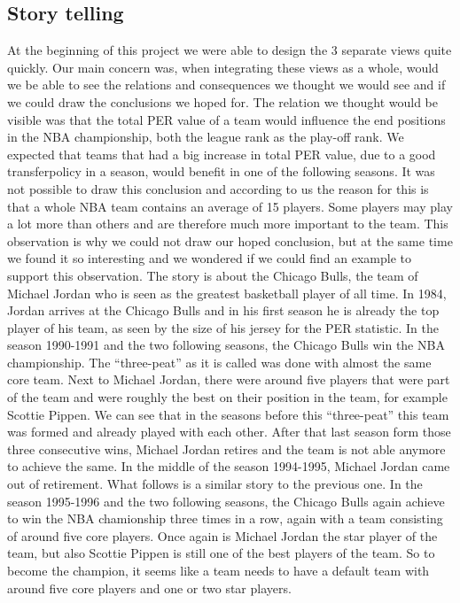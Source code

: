 \documentclass[chi_draft]{sigchi}
\begin{document}
\subsection{Story telling}
At the beginning of this project we were able to design the 3 separate views
quite quickly. Our main concern was, when integrating these views as a whole, would 
we be able to see the relations and consequences we thought we would see and if 
we could draw the conclusions we hoped for. The relation we thought would be visible 
was that the total PER value of a team would influence the end positions in the NBA championship, both the league rank as the play-off rank. We expected that teams 
that had a big increase in total PER value, due to a good transferpolicy in a 
season, would benefit in one of the following seasons. It was not possible to draw this conclusion and according to us the reason for this is that a whole NBA team contains an average of 15 players. Some players may play a lot more than others and 
are therefore much more important to the team. This observation is why we could not draw our hoped conclusion, but at the same time we found it so interesting and we wondered if we could find an example to support this observation. The story is about 
the Chicago Bulls, the team of Michael Jordan who is seen as the greatest basketball 
player of all time. In 1984, Jordan arrives at the Chicago Bulls and in his first season he is already the top player of his team, as seen by the size of his jersey for the PER statistic. In the season 1990-1991 and the two following seasons, the 
Chicago Bulls win the NBA championship. The ``three-peat'' as it is called was done 
with almost the same core team. Next to Michael Jordan, there were around five 
players that were part of the team and were roughly the best on their position in 
the team, for example Scottie Pippen. We can see that in the seasons before this 
``three-peat'' this team was formed and already played with each other. After that 
last season form those three consecutive wins, Michael Jordan retires and the team 
is not able anymore to achieve the same. In the middle of the season 1994-1995, Michael Jordan came out of retirement. What follows is a similar story to the previous one. In the season 1995-1996 and the two following seasons, the Chicago 
Bulls again achieve to win the NBA chamionship three times in a row, again with a  team consisting of around five core players. Once again is Michael Jordan the star 
player of the team, but also Scottie Pippen is still one of the best players of the team. So to become the champion, it seems like a team needs to have a default team 
with around five core players and one or two star players.
\end{document}
